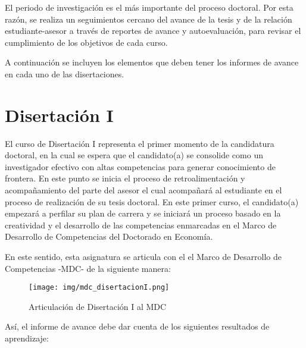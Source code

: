 El periodo de investigación es el más importante del proceso doctoral. Por esta razón, se realiza un seguimientos cercano del avance de la tesis y de la relación estudiante-asesor a través de reportes de avance y autoevaluación, para revisar el cumplimiento de los objetivos de cada curso.

A continuación se incluyen los elementos que deben tener los informes de avance en cada uno de las disertaciones.

\section{Disertación I}

El curso de Disertación I representa el primer momento de la candidatura doctoral, en la cual se espera que el candidato(a) se consolide como un investigador efectivo con altas competencias para generar conocimiento de frontera. En este punto se inicia el proceso de retroalimentación y acompañamiento del parte del asesor el cual acompañará al estudiante en el proceso de realización de su tesis doctoral. En este primer curso, el candidato(a) empezará a perfilar su plan de carrera y se iniciará un proceso basado en la creatividad y el desarrollo de las competencias enmarcadas en el Marco de Desarrollo de Competencias del Doctorado en Economía.

En este sentido, esta asignatura se articula con el el Marco de Desarrollo de Competencias -MDC- de la siguiente manera:

\begin{figure}[H]
\caption{Articulación de Disertación I al MDC \label{hito1_mdc} }
\begin{center}
\texttt{[image: img/mdc\_disertacionI.png]}
\end{center}
\end{figure}


Así, el informe de avance debe dar cuenta de los siguientes resultados de aprendizaje:

